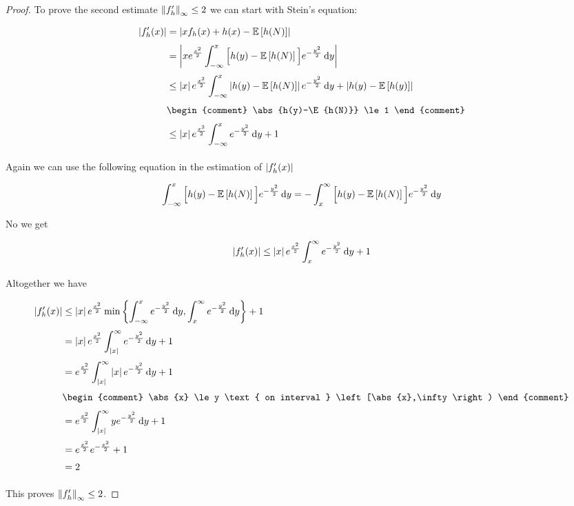 \begin{proof}
  \noindent To prove the second estimate $\left\|{f_h'}\right\|_\infty \le 2$ we can start with Stein's equation:

  \begin{align}
    \abs{f_h'(x)} & = \abs{x f_h(x) + h(x) - \E{h(N)}} \nl
    & = \abs{x \e{\frac{x^2}{2}} \int_{-\infty}^x \Big[ h(y) - \E{h(N)} \Big] \e{-\frac{y^2}{2}} \d{y}} \nl
    & \le \abs{x} \e{\frac{x^2}{2}} \int_{-\infty}^x \abs{h(y)-\E{h(N)}} \e{-\frac{y^2}{2}} \d{y}  + \abs{h(y)-\E{h(y)}} \nl
    &
    \begin{comment}
      \abs{h(y)-\E{h(N)}} \le 1
    \end{comment} \nl
    & \le \abs{x} \e{\frac{x^2}{2}} \int_{-\infty}^x \e{-\frac{y^2}{2}} \d{y}  + 1 \nl
  \end{align}

  \noindent Again we can use the following equation in the estimation of $\left|{f_h'(x)}\right|$

  \begin{align}
    \int_{-\infty}^x \Big[h(y)-\mathbb E\left[{h(N)}\right]\Big] e^{-\frac{y^2}{2}} \,\mathrm d{y} = -\int_{x}^\infty \Big[h(y)-\mathbb E\left[{h(N)}\right]\Big] e^{-\frac{y^2}{2}} \,\mathrm d{y}
  \end{align}

  \noindent No we get

  \begin{align}
    \abs{f_h'(x)} \le \abs{x} \e{\frac{x^2}{2}} \int_x^\infty \e{-\frac{y^2}{2}} \d{y}  + 1 \nl
  \end{align}

  \noindent Altogether we have

  \begin{align}
    \abs{f_h'(x)} & \le \abs{x} \e{\frac{x^2}{2}} \min\left\{ \int_{-\infty}^x \e{-\frac{y^2}{2}} \d{y},  \int_x^\infty \e{-\frac{y^2}{2}} \d{y} \right\} + 1 \nl
    & = \abs{x} \e{\frac{x^2}{2}} \int_{\abs{x}}^\infty \e{-\frac{y^2}{2}} \d{y} + 1 \nl
    & = \e{\frac{x^2}{2}} \int_{\abs{x}}^\infty \abs{x} \e{-\frac{y^2}{2}} \d{y} + 1 \nl
    &
    \begin{comment}
      \abs{x} \le y \text{ on interval } \left[\abs{x},\infty\right)
    \end{comment} \nl
    & = \e{\frac{x^2}{2}} \int_{\abs{x}}^\infty y \e{-\frac{y^2}{2}} \d{y} + 1 \nl
    & = \e{\frac{x^2}{2}} \e{-\frac{x^2}{2}} + 1 \nl
    & = 2 \nl
  \end{align}

  \noindent This proves $\left\|{f_h'}\right\|_\infty \le 2$.
\end{proof}

